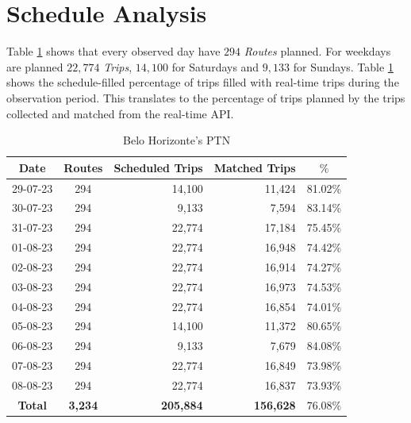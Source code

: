 \section{Schedule Analysis}

Table \ref{tab:schedule}
shows that every observed day have $294$ \textit{Routes} planned. For weekdays are planned $22,774$ \textit{Trips},
$14,100$ for Saturdays and $9,133$ for Sundays. Table \ref{tab:schedule} shows the schedule-filled percentage of trips filled with real-time trips during the observation period. This translates to the percentage of trips planned by the trips collected and matched from the real-time API.

\begin{table}[h]
\centering
\caption{Belo Horizonte's PTN} 
\begin{tabular}{|c|c|r|r|c|}
\hline
Date & Routes    & Scheduled Trips  & Matched Trips & $\%$ \\ \hline
29-07-23 & 294 &  14,100 &     11,424   & 81.02\%\\ \hline
30-07-23 & 294 & 9,133 &  7,594  &   83.14\% \\ \hline
31-07-23 & 294 & 22,774 &  17,184  &   75.45\%  \\ \hline
01-08-23 & 294 & 22,774 &  16,948  &   74.42\%  \\ \hline
02-08-23 & 294 & 22,774 &  16,914  &   74.27\%  \\ \hline
03-08-23 & 294 & 22,774 & 16,973  &   74.53\%  \\ \hline
04-08-23 & 294 & 22,774 &  16,854  &   74.01\%  \\ \hline
05-08-23 & 294 & 14,100 &  11,372  &   80.65\%  \\ \hline
06-08-23 & 294 & 9,133 &  7,679  &   84.08\%  \\ \hline
07-08-23 & 294 & 22,774 & 16,849  &   73.98\%  \\ \hline
08-08-23 & 294 & 22,774 &  16,837  &   73.93\%  \\ \hline
\textbf{Total} & \textbf{3,234} & \textbf{205,884} &  \textbf{156,628}  &   \textbf{$76.08\%$}  \\ \hline
\end{tabular}
\label{tab:schedule}
\end{table}

